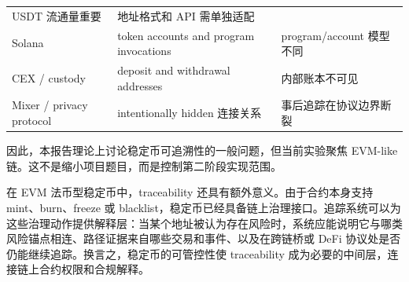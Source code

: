 \documentclass[12pt,a4paper]{ctexart}
\begin{document}
\begin{longtable}[]{@{}lll@{}}
\begin{minipage}[t]{0.30\columnwidth}
USDT 流通量重要\strut
\end{minipage} & \begin{minipage}[t]{0.30\columnwidth}\raggedright
地址格式和 API 需单独适配\strut
\end{minipage}\tabularnewline
\begin{minipage}[t]{0.30\columnwidth}\raggedright
Solana\strut
\end{minipage} & \begin{minipage}[t]{0.30\columnwidth}\raggedright
token accounts and program invocations\strut
\end{minipage} & \begin{minipage}[t]{0.30\columnwidth}\raggedright
program/account 模型不同\strut
\end{minipage}\tabularnewline
\begin{minipage}[t]{0.30\columnwidth}\raggedright
CEX / custody\strut
\end{minipage} & \begin{minipage}[t]{0.30\columnwidth}\raggedright
deposit and withdrawal addresses\strut
\end{minipage} & \begin{minipage}[t]{0.30\columnwidth}\raggedright
内部账本不可见\strut
\end{minipage}\tabularnewline
\begin{minipage}[t]{0.30\columnwidth}\raggedright
Mixer / privacy protocol\strut
\end{minipage} & \begin{minipage}[t]{0.30\columnwidth}\raggedright
intentionally hidden 连接关系\strut
\end{minipage} & \begin{minipage}[t]{0.30\columnwidth}\raggedright
事后追踪在协议边界断裂\strut
\end{minipage}\tabularnewline
\bottomrule
\end{longtable}

因此，本报告理论上讨论稳定币可追溯性的一般问题，但当前实验聚焦 EVM-like
链。这不是缩小项目题目，而是控制第二阶段实现范围。

在 EVM 法币型稳定币中，traceability 还具有额外意义。由于合约本身支持
mint、burn、freeze 或
blacklist，稳定币已经具备链上治理接口。追踪系统可以为这些治理动作提供解释层：当某个地址被认为存在风险时，系统应能说明它与哪类风险锚点相连、路径证据来自哪些交易和事件、以及在跨链桥或
DeFi 协议处是否仍能继续追踪。换言之，稳定币的可管控性使 traceability
成为必要的中间层，连接链上合约权限和合规解释。
\end{document}
